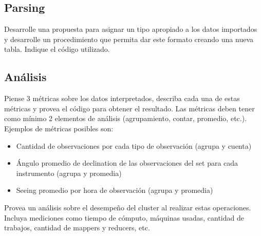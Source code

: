 \documentclass[12pt,letterpaper,twoside]{article}
\begin{document}
\subsection{Parsing}

{\color{red} Desarrolle una propuesta para asignar un tipo apropiado a los datos importados y desarrolle un procedimiento que permita dar este formato creando una nueva tabla. Indique el código utilizado.}

\subsection{Análisis}

{\color{red} Piense 3 métricas sobre los datos interpretados, describa cada una de estas métricas y provea el código para obtener el resultado. Las métricas deben tener como mínimo 2 elementos de análisis (agrupamiento, contar, promedio, etc.). Ejemplos de métricas posibles son:
\begin{itemize}
  \item Cantidad de observaciones por cada tipo de observación (agrupa y cuenta)
  \item Ángulo promedio de declination de las observaciones del set para cada instrumento (agrupa y promedia)
  \item Seeing promedio por hora de observación (agrupa y promedia)
\end{itemize}
Provea un análisis sobre el desempeño del cluster al realizar estas operaciones. Incluya mediciones como tiempo de cómputo, máquinas usadas, cantidad de trabajos, cantidad de mappers y reducers, etc.}
\end{document}
